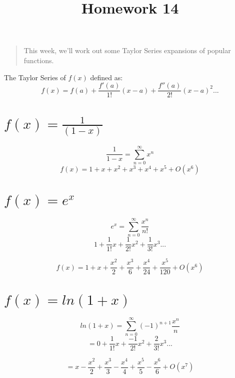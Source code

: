\documentclass[]{article}
\title{Homework 14}
\author{}
\date{}
\begin{document}
\maketitle

{
\setcounter{tocdepth}{2}
\tableofcontents
}
\begin{quote}
This week, we'll work out some Taylor Series expansions of popular
functions.
\end{quote}

The Taylor Series of \(f(x)\) defined as:
\[f(x) = f(a) + \frac{f'(a)}{1!}(x-a) + \frac{f''(a)}{2!}(x-a)^2...\]

\section{\texorpdfstring{\(f(x) = \frac{1}{(1-x)}\)}{f(x) = \textbackslash{}frac\{1\}\{(1-x)\}}}\label{fx-frac11-x}

\[\frac{1}{1-x} = \sum_{n=0}^{\infty} x^n\]
\[f(x) = 1 + x + x^2 + x^3 + x^4 + x^5 + O(x^6)\]

\section{\texorpdfstring{\(f(x) = e^x\)}{f(x) = e\^{}x}}\label{fx-ex}

\[e^x = \sum_{n=0}^{\infty} \frac{x^n}{n!}\]
\[1 + \frac{1}{1!}x + \frac{1}{2!}x^2+\frac{1}{3!}x^3...\]

\[f(x) = 1 + x + \frac{x^2}{2} +  \frac{x^3}{6} +  \frac{x^4}{24} +  \frac{x^5}{120} + O(x^6)\]

\section{\texorpdfstring{\(f(x) = ln(1 + x)\)}{f(x) = ln(1 + x)}}\label{fx-ln1-x}

\[ln(1 + x) = \sum_{n=0}^{\infty} (-1)^{n+1}\frac{x^n}{n}\]
\[= 0 + \frac{1}{1!}x + \frac{-1}{2!}x^2 + \frac{2}{3!}x^3...\]

\[= x - \frac{x^2}{2} +  \frac{x^3}{3} -  \frac{x^4}{4} + \frac{x^5}{5} - \frac{x^6}{6} + O(x^7)\]
\end{document}
